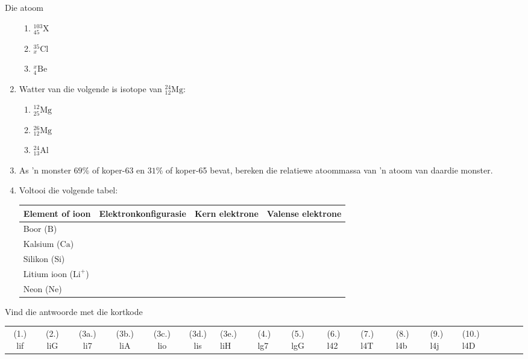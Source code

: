 \begin{eocexercises}{Die atoom}
\begin{enumerate}[noitemsep, label=\textbf{\arabic*}. ]
\begin{enumerate}[noitemsep, label=\textbf{\alph*}. ]
            \item $_{45}^{103}\text{X}$
\item $_{x}^{35}\text{Cl}$
\item $_{4}^{x}\text{Be}$
\end{enumerate}
\item Watter van die volgende is isotope van $_{12}^{24}\text{Mg}$: \label{m38741*id743234}
\begin{enumerate}[noitemsep, label=\textbf{\alph*}. ] 
            \item $_{25}^{12}\text{Mg}$
\item $_{12}^{26}\text{Mg}$
\item $_{13}^{24}\text{Al}$
\end{enumerate}
\item As 'n monster $69\%$ of koper-63 en $31\%$ of koper-65 bevat, bereken die relatiewe atoommassa van 'n atoom van daardie monster.
            \item Voltooi die volgende tabel:
          \begin{table}[H]
        \begin{center}
      \label{m38741*eip-282}
    \noindent
      \begin{tabular}{|l|l|l|l|}\hline
        Element of ioon &
        Elektronkonfigurasie &
        Kern elektrone &
        Valense elektrone \\ \hline
        Boor ($\text{B}$) &
         &
         &
       \\ \hline
        Kalsium ($\text{Ca}$) &
         &
         &
     \\ \hline
        Silikon ($\text{Si}$) &
         &
         &
       \\ \hline
        Litium ioon ($\text{Li}^{+}$) &
         &
         &
      \\ \hline
        Neon ($\text{Ne}$) &
         &
         &
     \\ \hline
    \end{tabular}
      \end{center}
\end{table}
    \par
\end{enumerate}
  \label{m38741**end}
  \label{ea1c9e59656f96ee804546971cf6dee6**end}
\par {} Vind die antwoorde met die kortkode
 \par \begin{tabular}[h]{cccccc}
 (1.) lif  &  (2.) liG  &  (3a.) li7  &  (3b.) liA  &  (3c.) lio  &  (3d.) lis  &  (3e.) liH  &  (4.) lg7  &  (5.) lgG  &  (6.) l42  &  (7.) l4T  &  (8.) l4b  &  (9.) l4j  &  (10.) l4D  &  & &  & \end{tabular}

\end{eocexercises}
